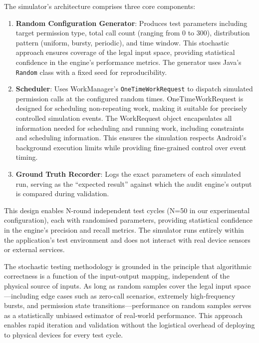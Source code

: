 The simulator's architecture comprises three core components:
\begin{enumerate}
\item \textbf{Random Configuration Generator}: Produces test parameters including target permission type, total call count (ranging from 0 to 300), distribution pattern (uniform, bursty, periodic), and time window. This stochastic approach ensures coverage of the legal input space, providing statistical confidence in the engine's performance metrics. The generator uses Java's \texttt{Random} class with a fixed seed for reproducibility.
\item \textbf{Scheduler}: Uses WorkManager's \texttt{OneTimeWorkRequest} to dispatch simulated permission calls at the configured random times. OneTimeWorkRequest is designed for scheduling non-repeating work, making it suitable for precisely controlled simulation events. The WorkRequest object encapsulates all information needed for scheduling and running work, including constraints and scheduling information. This ensures the simulation respects Android's background execution limits while providing fine-grained control over event timing.
\item \textbf{Ground Truth Recorder}: Logs the exact parameters of each simulated run, serving as the ``expected result'' against which the audit engine's output is compared during validation.
\end{enumerate}

This design enables N-round independent test cycles (N=50 in our experimental configuration), each with randomised parameters, providing statistical confidence in the engine's precision and recall metrics. The simulator runs entirely within the application's test environment and does not interact with real device sensors or external services.

The stochastic testing methodology is grounded in the principle that algorithmic correctness is a function of the input-output mapping, independent of the physical source of inputs. As long as random samples cover the legal input space—including edge cases such as zero-call scenarios, extremely high-frequency bursts, and permission state transitions—performance on random samples serves as a statistically unbiased estimator of real-world performance. This approach enables rapid iteration and validation without the logistical overhead of deploying to physical devices for every test cycle.

